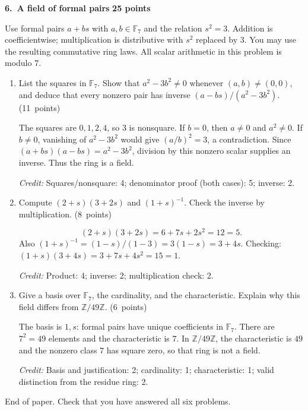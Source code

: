 \documentclass[11pt,letterpaper]{article}
\newcommand{\partpts}[1]{\unskip\nobreak\hspace{.3em}%
  \mbox{\small\color{muted}(#1 points)}}
\newcommand{\credit}[1]{\par{\footnotesize\color{muted}\textit{Credit:} #1}}
\newcommand{\problem}[3]{\par\addvspace{9pt}%
  {\large\bfseries\color{indigo}#1.\ #2}\hfill
  {\small\color{muted}\textbf{#3 points}}\par\nobreak}
\begin{document}
\newpage
\problem{6}{A field of formal pairs}{25}
Use formal pairs $a+bs$ with $a,b\in\mathbb F_7$ and the relation $s^2=3$.
Addition is coefficientwise; multiplication is distributive with $s^2$
replaced by $3$. You may use the resulting commutative ring laws.
All scalar arithmetic in this problem is modulo $7$.
\begin{enumerate}
\item List the squares in $\mathbb F_7$. Show that $a^2-3b^2\ne0$
whenever $(a,b)\ne(0,0)$, and deduce that every nonzero pair has inverse
$(a-bs)/(a^2-3b^2)$. \partpts{11}
\begin{solution}[1.65in]
The squares are $0,1,2,4$, so $3$ is nonsquare. If $b=0$, then $a\ne0$
and $a^2\ne0$. If $b\ne0$, vanishing of $a^2-3b^2$ would give
$(a/b)^2=3$, a contradiction. Since
$(a+bs)(a-bs)=a^2-3b^2$, division by this nonzero scalar supplies an inverse.
Thus the ring is a field.
\credit{Squares/nonsquare: 4; denominator proof (both cases): 5; inverse: 2.}
\end{solution}
\item Compute $(2+s)(3+2s)$ and $(1+s)^{-1}$. Check the inverse by
multiplication. \partpts{8}
\begin{solution}[1.5in]
\[
(2+s)(3+2s)=6+7s+2s^2=12=5.
\]
Also $(1+s)^{-1}=(1-s)/(1-3)=3(1-s)=3+4s$.
Checking: $(1+s)(3+4s)=3+7s+4s^2=15=1$.
\credit{Product: 4; inverse: 2; multiplication check: 2.}
\end{solution}
\item Give a basis over $\mathbb F_7$, the cardinality, and the
characteristic. Explain why this field differs from $\mathbb Z/49\mathbb Z$.
\partpts{6}
\begin{solution}[1.3in]
The basis is $1,s$: formal pairs have unique coefficients in
$\mathbb F_7$. There are $7^2=49$ elements and the characteristic is $7$.
In $\mathbb Z/49\mathbb Z$, the characteristic is $49$ and the nonzero
class $7$ has square zero, so that ring is not a field.
\credit{Basis and justification: 2; cardinality: 1; characteristic: 1;
valid distinction from the residue ring: 2.}
\end{solution}
\end{enumerate}
\vfill
\begin{center}\small\color{muted}End of paper. Check that you have answered all six problems.\end{center}
\label{exam-last-page}
\end{document}
